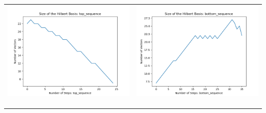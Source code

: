 \documentclass[10pt]{article}
\begin{document}
\begin{tabular}{c|c}
\begin{minipage}{.45\textwidth}
\includegraphics[width=\textwidth]{"DATA/5d/6 generators 2 bound H/top_sequence SIZE"}
\end{minipage} &
\begin{minipage}{.45\textwidth}
\includegraphics[width=\textwidth]{"DATA/5d/6 generators 2 bound H bottomup/bottom_sequence SIZE"}
\end{minipage} \\ \\
\hline \\\begin{minipage}{.45\textwidth}

\end{minipage}
\end{tabular}
\end{document}
